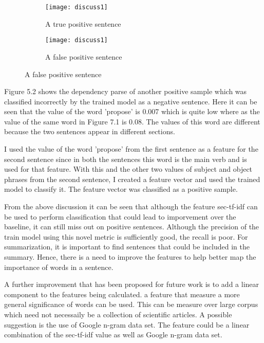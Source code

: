 \begin{figure}[h]
\begin{subfigure}{0.5\textwidth}
\texttt{[image: discuss1]} 
\caption{A true positive sentence}
\label{fig:dep-discus1}
\end{subfigure}
\begin{subfigure}{0.5\textwidth}
\texttt{[image: discuss1]}
\caption{A false positive sentence}
\label{fig:dep-discus2}
\end{subfigure}
\label{fig:stanford-dep-parse}
\end{figure}

Figure 5.2 shows the dependency parse of another positive sample which was classified incorrectly by the trained model as a negative sentence.
Here it can be seen that the value of the word 'propose' is 0.007 which is quite low where as the value of the same word in Figure 7.1 is 0.08.
The values of this word are different because the two sentences appear in different sections.

I used the value of the word 'propose' from the first sentence as a feature for the second sentence since in both the sentences this word is the main verb and is used for that feature.
With this and the other two values of subject and object phrases from the second sentence, I created a feature vector and used the trained model to classify it.
The feature vector was classified as a positive sample.

From the above discussion it can be seen that although the feature sec-tf-idf can be used to perform classification that could lead to imporvement over the baseline, it can still miss out on positive sentences.
Although the precision of the train model using this novel metric is sufficiently good, the recall is poor.
For summarization, it is important to find sentences that could be included in the summary.
Hence, there is a need to improve the features to help better map the importance of words in a sentence.

A further improvement that has been proposed for future work is to add a linear component to the features being calculated.
a feature that measure a more general significance of words can be used.
This can be measure over large corpus which need not necessaily be a collection of scientific articles.
A possible suggestion is the use of Google n-gram data set.
The feature could be a linear combination of the sec-tf-idf value as well as Google n-gram data set.